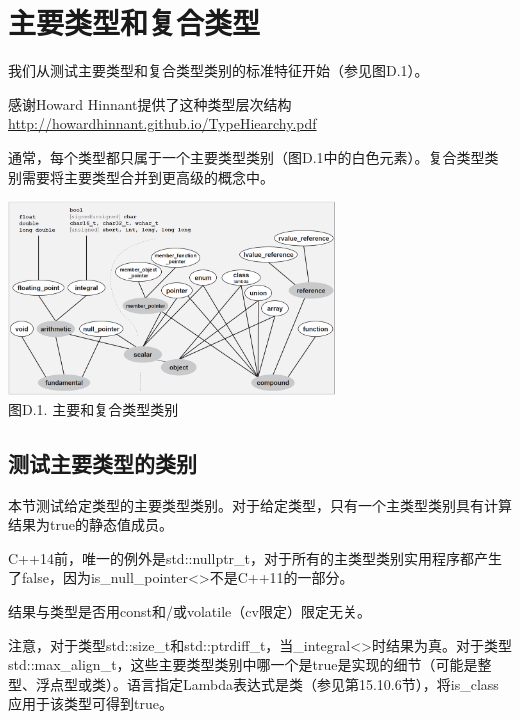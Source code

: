 \section{主要类型和复合类型}

我们从测试主要类型和复合类型类别的标准特征开始（参见图D.1）。

\begin{notice}
感谢Howard Hinnant提供了这种类型层次结构\url{http://howardhinnant.github.io/TypeHiearchy.pdf}
\end{notice}

通常，每个类型都只属于一个主要类型类别（图D.1中的白色元素）。复合类型类别需要将主要类型合并到更高级的概念中。

\begin{center}
\includegraphics[width=0.65\textwidth]{backmatter/Appendix/D/images/1.png} \\
图D.1. 主要和复合类型类别
\end{center}

\subsection{测试主要类型的类别}

本节测试给定类型的主要类型类别。对于给定类型，只有一个主类型类别具有计算结果为true的静态值成员。

\begin{notice}
C++14前，唯一的例外是std::nullptr\_t，对于所有的主类型类别实用程序都产生了false，因为is\_null\_pointer<>不是C++11的一部分。
\end{notice}

结果与类型是否用const和/或volatile（cv限定）限定无关。

注意，对于类型std::size\_t和std::ptrdiff\_t，当\_integral<>时结果为真。对于类型std::max\_align\_t，这些主要类型类别中哪一个是true是实现的细节（可能是整型、浮点型或类）。语言指定Lambda表达式是类（参见第15.10.6节），将is\_class应用于该类型可得到true。

